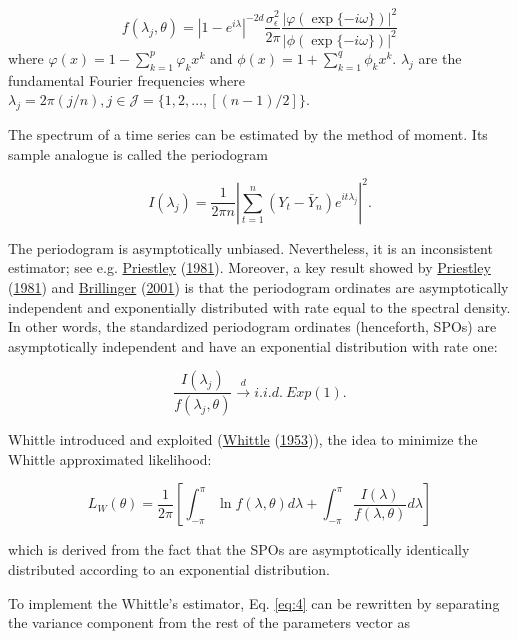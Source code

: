 \documentclass[
  11pt,
]{article}
\begin{document}
\[
f(\lambda_j, \theta)=\left|1-e^{i \lambda}\right|^{-2 d}\frac{\sigma_{\epsilon}^{2}}{2 \pi} \frac{|\varphi(\exp \{-i \omega\})|^{2}}{|\phi(\exp \{-i \omega\})|^{2}}
\] where \(\varphi(x)=1-\sum_{k=1}^{p} \varphi_{k} x^{k}\) and
\(\phi(x)=1+\sum_{k=1}^{q} \phi_{k} x^{k}\). \(\lambda_j\) are the
fundamental Fourier frequencies where
\(\lambda_j=2 \pi(j / n), j \in \mathcal{J}=\{1,2, \ldots,[(n-1) / 2]\}\).

The spectrum of a time series can be estimated by the method of moment.
Its sample analogue is called the periodogram

\[I\left(\lambda_{j}\right)=\frac{1}{2 \pi n}\left|\sum_{t=1}^{n}\left(Y_{t}-\bar{Y}_{n}\right) e^{i t \lambda_{j}}\right|^{2}.\]

The periodogram is asymptotically unbiased. Nevertheless, it is an
inconsistent estimator; see e.g.
\protect\hyperlink{ref-priestley1981spectral}{Priestley}
(\protect\hyperlink{ref-priestley1981spectral}{1981}). Moreover, a key
result showed by
\protect\hyperlink{ref-priestley1981spectral}{Priestley}
(\protect\hyperlink{ref-priestley1981spectral}{1981}) and
\protect\hyperlink{ref-brillinger2001time}{Brillinger}
(\protect\hyperlink{ref-brillinger2001time}{2001}) is that the
periodogram ordinates are asymptotically independent and exponentially
distributed with rate equal to the spectral density. In other words, the
standardized periodogram ordinates (henceforth, SPOs) are asymptotically
independent and have an exponential distribution with rate one:

\[\frac{I(\lambda_j)}{f(\lambda_j, \theta)}  \stackrel{d}{\rightarrow} i . i . d . \ Exp(1).\]

Whittle introduced and exploited
(\protect\hyperlink{ref-whittle1953estimation}{Whittle}
(\protect\hyperlink{ref-whittle1953estimation}{1953})), the idea to
minimize the Whittle approximated likelihood:

\begin{equation}
\label{eq:4}
L_{W}(\theta)=\frac{1}{2 \pi}\left[\int_{-\pi}^{\pi} \ln f(\lambda, \theta) d \lambda+\int_{-\pi}^{\pi} \frac{I(\lambda)}{f(\lambda, \theta)} d \lambda\right]
\end{equation}

which is derived from the fact that the SPOs are asymptotically
identically distributed according to an exponential distribution.

To implement the Whittle's estimator, Eq. \ref{eq:4} can be
rewritten by separating the variance component from the rest of the
parameters vector as
\end{document}
